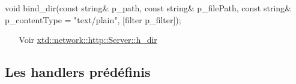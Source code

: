 \begin{DoxyItemize}
\item 
\begin{DoxyCode}
\textcolor{keywordtype}{void} bind\_dir(\textcolor{keyword}{const} \textcolor{keywordtype}{string}& p\_path,
              \textcolor{keyword}{const} \textcolor{keywordtype}{string}& p\_filePath,
              \textcolor{keyword}{const} \textcolor{keywordtype}{string}& p\_contentType = \textcolor{stringliteral}{"text/plain"},
              [filter            p\_filter]);
\end{DoxyCode}
 ~\newline
~\newline
 Voir \hyperlink{classxtd_1_1network_1_1http_1_1Server_a7b7fb002ef005e7dd7b502c95587f4f2}{xtd\+::network\+::http\+::\+Server\+::h\+\_\+dir} ~\newline
~\newline

\end{DoxyItemize}

\subsection*{Les handlers prédéfinis }



